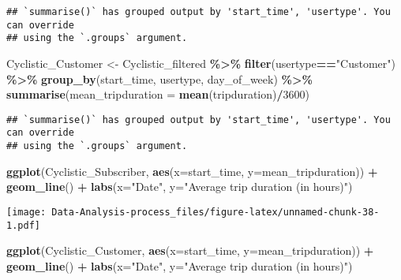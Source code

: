 \documentclass[
]{article}
\newenvironment{Shaded}{\begin{snugshade}}{\end{snugshade}}
\newcommand{\AttributeTok}[1]{\textcolor[rgb]{0.13,0.29,0.53}{#1}}
\newcommand{\DecValTok}[1]{\textcolor[rgb]{0.00,0.00,0.81}{#1}}
\newcommand{\FunctionTok}[1]{\textcolor[rgb]{0.13,0.29,0.53}{\textbf{#1}}}
\newcommand{\NormalTok}[1]{#1}
\newcommand{\OtherTok}[1]{\textcolor[rgb]{0.56,0.35,0.01}{#1}}
\newcommand{\SpecialCharTok}[1]{\textcolor[rgb]{0.81,0.36,0.00}{\textbf{#1}}}
\newcommand{\StringTok}[1]{\textcolor[rgb]{0.31,0.60,0.02}{#1}}
\begin{document}
\begin{verbatim}
## `summarise()` has grouped output by 'start_time', 'usertype'. You can override
## using the `.groups` argument.
\end{verbatim}

\begin{Shaded}
\begin{Highlighting}[]
\NormalTok{Cyclistic\_Customer }\OtherTok{\textless{}{-}}\NormalTok{ Cyclistic\_filtered }\SpecialCharTok{\%\textgreater{}\%}
  \FunctionTok{filter}\NormalTok{(usertype}\SpecialCharTok{==}\StringTok{"Customer"}\NormalTok{) }\SpecialCharTok{\%\textgreater{}\%}
  \FunctionTok{group\_by}\NormalTok{(start\_time, usertype, day\_of\_week) }\SpecialCharTok{\%\textgreater{}\%}
  \FunctionTok{summarise}\NormalTok{(}\AttributeTok{mean\_tripduration =} \FunctionTok{mean}\NormalTok{(tripduration)}\SpecialCharTok{/}\DecValTok{3600}\NormalTok{)}
\end{Highlighting}
\end{Shaded}

\begin{verbatim}
## `summarise()` has grouped output by 'start_time', 'usertype'. You can override
## using the `.groups` argument.
\end{verbatim}

\begin{Shaded}
\begin{Highlighting}[]
\FunctionTok{ggplot}\NormalTok{(Cyclistic\_Subscriber, }\FunctionTok{aes}\NormalTok{(}\AttributeTok{x=}\NormalTok{start\_time, }\AttributeTok{y=}\NormalTok{mean\_tripduration)) }\SpecialCharTok{+} 
  \FunctionTok{geom\_line}\NormalTok{() }\SpecialCharTok{+}
  \FunctionTok{labs}\NormalTok{(}\AttributeTok{x=}\StringTok{"Date"}\NormalTok{, }\AttributeTok{y=}\StringTok{"Average trip duration (in hours)"}\NormalTok{)}
\end{Highlighting}
\end{Shaded}

\texttt{[image: Data-Analysis-process\_files/figure-latex/unnamed-chunk-38-1.pdf]}

\begin{Shaded}
\begin{Highlighting}[]
\FunctionTok{ggplot}\NormalTok{(Cyclistic\_Customer, }\FunctionTok{aes}\NormalTok{(}\AttributeTok{x=}\NormalTok{start\_time, }\AttributeTok{y=}\NormalTok{mean\_tripduration)) }\SpecialCharTok{+} 
  \FunctionTok{geom\_line}\NormalTok{() }\SpecialCharTok{+}
  \FunctionTok{labs}\NormalTok{(}\AttributeTok{x=}\StringTok{"Date"}\NormalTok{, }\AttributeTok{y=}\StringTok{"Average trip duration (in hours)"}\NormalTok{)}
\end{Highlighting}
\end{Shaded}
\end{document}
